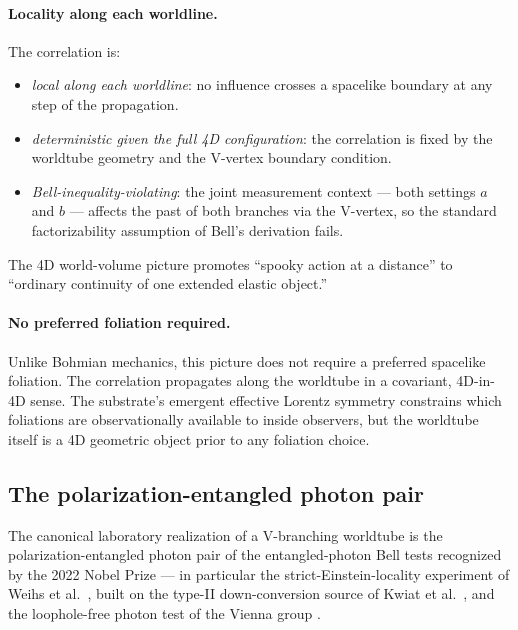 \paragraph{Locality along each worldline.}
The correlation is:
\begin{itemize}
  \item \emph{local along each worldline}: no influence crosses a spacelike boundary at any
  step of the propagation.
  \item \emph{deterministic given the full 4D configuration}: the correlation is fixed by the
  worldtube geometry and the V-vertex boundary condition.
  \item \emph{Bell-inequality-violating}: the joint measurement context --- both settings $a$ and
  $b$ --- affects the past of both branches via the V-vertex, so the standard factorizability
  assumption of Bell's derivation fails.
\end{itemize}
The 4D world-volume picture promotes ``spooky action at a distance'' to ``ordinary continuity of
one extended elastic object.''

\paragraph{No preferred foliation required.}
Unlike Bohmian mechanics, this picture does not require a preferred spacelike foliation.
The correlation propagates along the worldtube in a covariant, 4D-in-4D sense.
The substrate's emergent effective Lorentz symmetry constrains which foliations are observationally
available to inside observers, but the worldtube itself is a 4D geometric object prior to any
foliation choice.

\subsection{The polarization-entangled photon pair}
\label{subsec:photon-v-worldtube}

The canonical laboratory realization of a V-branching worldtube is the polarization-entangled
photon pair of the entangled-photon Bell tests recognized by the 2022 Nobel Prize --- in
particular the strict-Einstein-locality experiment of Weihs et al.\ \citep{Weihs1998}, built on the
type-II down-conversion source of Kwiat et al.\ \citep{Kwiat1995}, and the loophole-free photon
test of the Vienna group \citep{Giustina2015}.

